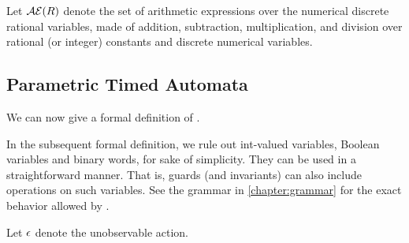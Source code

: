 Let $\mathcal{AE}(R)$ denote the set of arithmetic expressions over the numerical discrete rational variables, \ie{} made of addition, subtraction, multiplication, and division over rational (or integer) constants and discrete numerical variables.



\subsection{\imitator{} Parametric Timed Automata}


We can now give a formal definition of \IPTA{}.

\begin{remark}
	In the subsequent formal definition, we rule out int-valued variables, Boolean variables and binary words, for sake of simplicity.
	They can be used in a straightforward manner.
	That is, guards (and invariants) can also include operations on such variables.
	See the grammar in \cref{chapter:grammar} for the exact behavior allowed by \imitator{}.
\end{remark}

Let $\epsilon$ denote the unobservable action.

